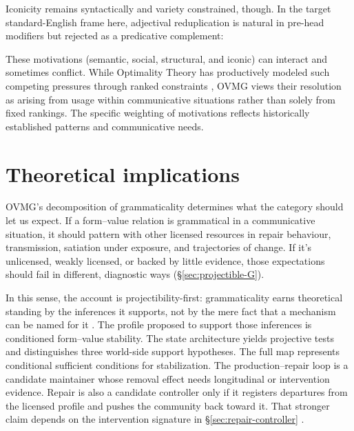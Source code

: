 \documentclass[12pt,letterpaper]{article}
\newcommand{\mention}[1]{\textit{#1}}
\begin{document}
Iconicity remains syntactically and variety constrained, though. In the target standard-English frame here, adjectival reduplication is natural in pre-head modifiers but rejected as a predicative complement:
\ea[*]{\mention{the problem was big big}}\label{ex:big-big2-change}
\z

These motivations (semantic, social, structural, and iconic) can interact and sometimes conflict. While Optimality Theory has productively modeled such competing pressures through ranked constraints \autocite{prince2004}, OVMG views their resolution as arising from usage within communicative situations rather than solely from fixed rankings. The specific weighting of motivations reflects historically established patterns and communicative needs.



\section{Theoretical implications}\label{sec:implications}

OVMG's decomposition of grammaticality determines what the category should let
us expect. If a form--value relation is grammatical in a
communicative situation, it should pattern with other licensed resources in
repair behaviour, transmission, satiation under exposure, and trajectories of
change. If it's unlicensed, weakly licensed, or backed by little evidence, those
expectations should fail in different, diagnostic ways (\S\ref{sec:projectible-G}).

In this sense, the account is projectibility-first: grammaticality
earns theoretical standing by the inferences it supports, not by the mere fact
that a mechanism can be named for it \autocite{Goodman1955, boyd1999,
millikan1999, khalidi2013, khalidi2018nodes, slater2015,
reynolds2026kindsProjectibilityProfiles}. The profile proposed to support those
inferences is conditioned form--value stability. The state architecture yields
projective tests and distinguishes three world-side support hypotheses. The
full map represents conditional sufficient conditions for stabilization. The
production--repair loop is a candidate maintainer whose removal effect needs
longitudinal or intervention evidence. Repair is also a candidate controller
only if it registers departures from the licensed profile and pushes the
community back toward it. That stronger claim depends on the intervention
signature in \S\ref{sec:repair-controller}
\autocite{woodward2003MakingThingsHappen, woodward2001,
reynolds2026notEveryStableCluster}.
\end{document}
